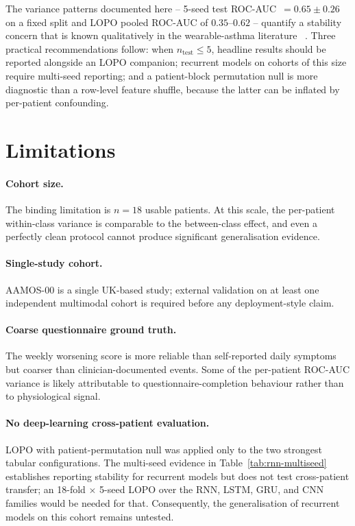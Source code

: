 \documentclass[11pt,a4paper]{article}
\newcommand{\rocauc}{ROC\nobreakdash-AUC}
\begin{document}
The variance patterns documented here -- 5-seed test
\rocauc{}~$=0.65\pm 0.26$ on a fixed split and LOPO pooled
\rocauc{} of $0.35$--$0.62$ -- quantify a stability concern that is
known qualitatively in the wearable-asthma literature~%
\cite{molfino2024,dehond2022,cokorudy2024}.  Three practical
recommendations follow: when $n_{\text{test}}\leq 5$, headline
results should be reported alongside an LOPO companion; recurrent
models on cohorts of this size require multi-seed reporting; and a
patient-block permutation null is more diagnostic than a row-level
feature shuffle, because the latter can be inflated by per-patient
confounding.

\section{Limitations}\label{sec:limits}

\paragraph{Cohort size.}
The binding limitation is $n=18$ usable patients.  At this scale,
the per-patient within-class variance is comparable to the
between-class effect, and even a perfectly clean protocol cannot
produce significant generalisation evidence.

\paragraph{Single-study cohort.}
AAMOS-00 is a single UK-based study; external validation on at
least one independent multimodal cohort is required before any
deployment-style claim.

\paragraph{Coarse questionnaire ground truth.}
The weekly worsening score is more reliable than self-reported
daily symptoms but coarser than clinician-documented events.  Some
of the per-patient \rocauc{} variance is likely attributable to
questionnaire-completion behaviour rather than to physiological
signal.

\paragraph{No deep-learning cross-patient evaluation.}
LOPO with patient-permutation null was applied only to the two
strongest tabular configurations.  The multi-seed evidence in
Table~\ref{tab:rnn-multiseed} establishes reporting stability for
recurrent models but does not test cross-patient transfer; an
18-fold $\times$ 5-seed LOPO over the RNN, LSTM, GRU, and CNN
families would be needed for that.  Consequently, the
generalisation of recurrent models on this cohort remains
untested.
\end{document}
